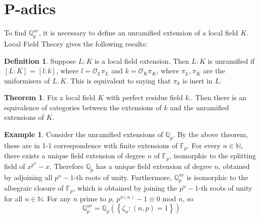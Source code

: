 \documentclass[12pt]{extarticle}
\newcommand{\N}{\mathbb{N}}
\newcommand{\F}{\mathbb{F}}
\newcommand{\Q}{\mathbb{Q}}
\newcommand{\co}{\mathcal{O}}
\newcommand{\<}{\langle}
\renewcommand{\>}{\rangle}
\theoremstyle{definition}
\newtheorem{theorem}{Theorem}
\newtheorem*{definition}{Definition}
\newtheorem*{example}{Example}
\begin{document}
\section{P-adics}
To find $\Q_p^{ur}$, it is necessary to define an unramified extension of a local field $K$. Local Field Theory \cite{} gives the following results:
\begin{definition}
Suppose $L:K$ is a local field extension. Then $L:K$ is unramified if $[L:K]$ = $[l:k]$, where $l = \co_L\pi_L$ and $ k= \co_K\pi_K$, where $\pi_L,\pi_K$ are the uniformisers of $L,K$. This is equivalent to saying that $\pi_k$ is inert in $L$. 
\end{definition}
\begin{theorem}
Fix a local field $K$ with perfect residue field $k$.. Then there is an equivalence of categories
between the extensions of $k$ and the unramified extensions of $K$. 
\end{theorem}
\begin{example}
Consider the unramified extensions of $\Q_p$. By the above theorem, these are in 1-1 correspondence with finite extensions of $\F_p$. For every $n \in \N$, there exists a unique field extension of degree $n$ of $\F_p$, isomorphic to the splitting field of $x^{p^n}-x$. Therefore $\Q_p$ has a unique field extension of degree $n$, obtained by adjoining all $p^n-1$-th roots of unity. Furthermore,
$\Q_p^{ur}$ is isomorphic to the albegraic closure of $\F_p$, which is obtained by joining the $p^n-1$-th roots of unity for all $n \in \N$. For any $n$ prime to $p$, $p^{\phi(n)}-1 \equiv 0$ mod $n$, so 
\begin{equation}
\Q_p^{ur} = \Q_p(\left\{ \zeta_n: (n,p)=1 \right\})
\end{equation}
\end{example}
\end{document}

